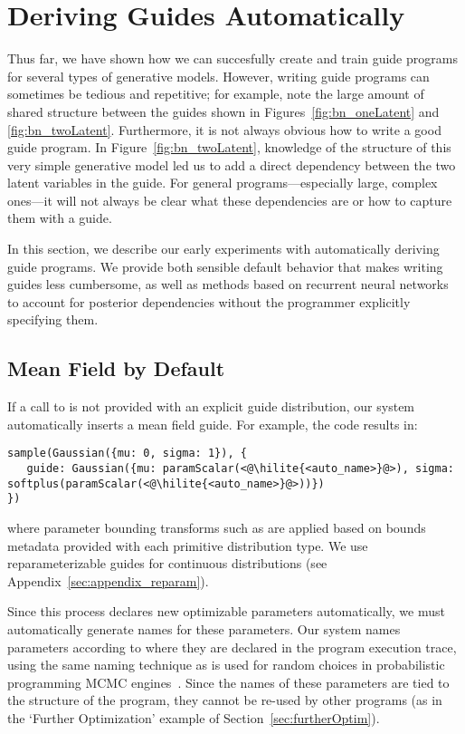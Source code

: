 \section{Deriving Guides Automatically}
\label{sec:autoGuide}

Thus far, we have shown how we can succesfully create and train guide programs for several types of generative models. However, writing guide programs can sometimes be tedious and repetitive; for example, note the large amount of shared structure between the guides shown in Figures~\ref{fig:bn_oneLatent} and \ref{fig:bn_twoLatent}. Furthermore, it is not always obvious how to write a good guide program. In Figure~\ref{fig:bn_twoLatent}, knowledge of the structure of this very simple generative model led us to add a direct dependency between the two latent variables in the guide. For general programs---especially large, complex ones---it will not always be clear what these dependencies are or how to capture them with a guide.

In this section, we describe our early experiments with automatically deriving guide programs. We provide both sensible default behavior that makes writing guides less cumbersome, as well as methods based on recurrent neural networks to account for posterior dependencies without the programmer explicitly specifying them.

\subsection{Mean Field by Default}

If a call to  is not provided with an explicit guide distribution, our system automatically inserts a mean field guide. For example, the code  results in:
\begin{lstlisting}
sample(Gaussian({mu: 0, sigma: 1}), {
   guide: Gaussian({mu: paramScalar(<@\hilite{<auto_name>}@>), sigma: softplus(paramScalar(<@\hilite{<auto_name>}@>))})
})
\end{lstlisting}
where parameter bounding transforms such as  are applied based on bounds metadata provided with each primitive distribution type. We use reparameterizable guides for continuous distributions (see Appendix~\ref{sec:appendix_reparam}).

Since this process declares new optimizable parameters automatically, we must automatically generate names for these parameters. Our system names parameters according to where they are declared in the program execution trace, using the same naming technique as is used for random choices in probabilistic programming MCMC engines~\cite{Lightweight}. Since the names of these parameters are tied to the structure of the program, they cannot be re-used by other programs (as in the `Further Optimization' example of Section~\ref{sec:furtherOptim}).

